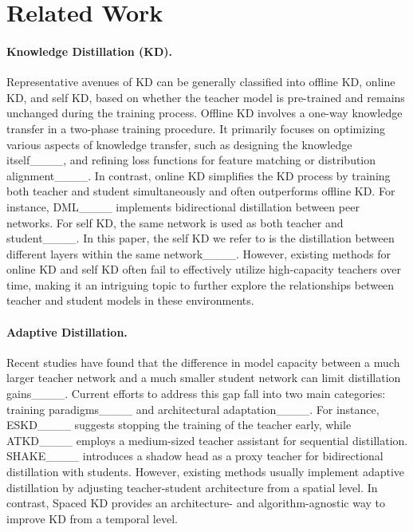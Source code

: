 \section{Related Work}
\label{sec:related}
\paragraph{Knowledge Distillation (KD).}
Representative avenues of KD can be generally classified into offline KD, online KD, and self KD, based on whether the teacher model is pre-trained and remains unchanged during the training process. Offline KD involves a one-way knowledge transfer in a two-phase training procedure. It primarily focuses on optimizing various aspects of knowledge transfer, such as designing the knowledge itself____, and refining loss functions for feature matching or distribution alignment____.
In contrast, online KD simplifies the KD process by training both teacher and student simultaneously and often outperforms offline KD. For instance, DML____ implements bidirectional distillation between peer networks. %
For self KD, the same network is used as both teacher and student____.
In this paper, the self KD we refer to is the distillation between different layers within the same network____. 
However, existing methods for online KD and self KD often fail to effectively utilize high-capacity teachers over time, making it an intriguing topic to further explore the relationships between teacher and student models in these environments.

\paragraph{Adaptive Distillation.}\label{adaptiveKD}
Recent studies have found that the difference in model capacity between a much larger teacher network and a much smaller student network can limit distillation gains____. Current efforts to address this gap fall into two main categories: training paradigms____ and architectural adaptation____. For instance, ESKD____ suggests stopping the training of the teacher early, while ATKD____ employs a medium-sized teacher assistant for sequential distillation. SHAKE____ introduces a shadow head as a proxy teacher for bidirectional distillation with students. However, existing methods usually implement adaptive distillation by adjusting teacher-student architecture from a spatial level. In contrast, Spaced KD provides an architecture- and algorithm-agnostic way to improve KD from a temporal level.

